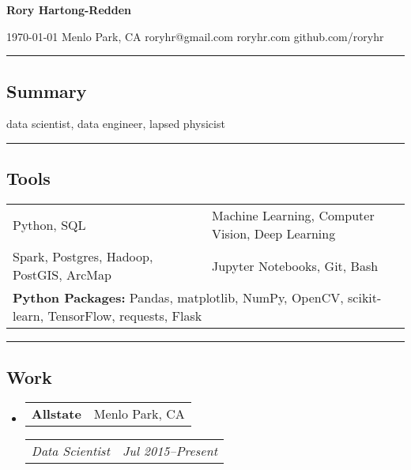 \documentclass[10pt,letterpaper]{article}
\makeatletter
\newenvironment{indentsection}[1]%
{\begin{list}{}%
	{\setlength{\leftmargin}{#1}}%
	\item[]%
}
{\end{list}}
\newcommand{\headerrow}[2]{
\begin{tabular*}{\linewidth}{l@{\extracolsep{\fill}}r}
		#1 &
		#2 \\
	\end{tabular*}
}
\newcommand{\jobitem}[4]{\item \headerrow{\textbf{#1}}{#2}
\headerrow{\emph{#3}}{\emph{#4}}}
\makeatother
\begin{document}
{\raggedright \LARGE \bf Rory Hartong-Redden\\}

{\raggedleft 
\today \/ \textbar
\/ Menlo Park, CA \textbar
\/ roryhr@gmail.com \textbar
\/ roryhr.com \textbar\/   
github.com/roryhr\\
}
\hrule

\subsection*{Summary}
\begin{centering}  
data scientist, data engineer, lapsed physicist\\
\end{centering}

\hrule
\subsection*{Tools}
\begin{indentsection}{\parindent}
\begin{tabular}{p{0.5\linewidth}   p{0.5\linewidth}} 
	Python, SQL
	& Machine Learning, Computer Vision, Deep Learning \\

	Spark, Postgres, Hadoop, PostGIS, ArcMap 
	& Jupyter Notebooks, Git, Bash \\ 
	
	\multicolumn{2}{l}{
		\textbf{Python Packages:} Pandas, matplotlib, NumPy, OpenCV, scikit-learn,
							TensorFlow, requests, Flask} \\
\end{tabular}
\end{indentsection}

\hrule
\subsection*{Work}
\begin{itemize}
	\jobitem{Allstate}{Menlo Park, CA}
		     {Data Scientist}{Jul 2015--Present}
\end{itemize}
\end{document}
